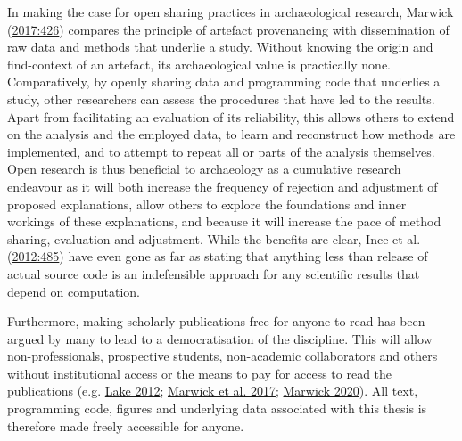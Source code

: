 \documentclass[
  12pt,
  a4paper,
  oneside]{book}
\begin{document}
In making the case for open sharing practices in archaeological research, Marwick (\protect\hyperlink{ref-marwick2017}{2017:426}) compares the principle of artefact provenancing with dissemination of raw data and methods that underlie a study. Without knowing the origin and find-context of an artefact, its archaeological value is practically none. Comparatively, by openly sharing data and programming code that underlies a study, other researchers can assess the procedures that have led to the results. Apart from facilitating an evaluation of its reliability, this allows others to extend on the analysis and the employed data, to learn and reconstruct how methods are implemented, and to attempt to repeat all or parts of the analysis themselves. Open research is thus beneficial to archaeology as a cumulative research endeavour as it will both increase the frequency of rejection and adjustment of proposed explanations, allow others to explore the foundations and inner workings of these explanations, and because it will increase the pace of method sharing, evaluation and adjustment. While the benefits are clear, Ince et al. (\protect\hyperlink{ref-ince2012}{2012:485}) have even gone as far as stating that \textquotesingle anything less than release of actual source code is an indefensible approach for any scientific results that depend on computation\textquotesingle.

Furthermore, making scholarly publications free for anyone to read has been argued by many to lead to a democratisation of the discipline. This will allow non-professionals, prospective students, non-academic collaborators and others without institutional access or the means to pay for access to read the publications (e.g. \protect\hyperlink{ref-lake2012}{Lake 2012}; \protect\hyperlink{ref-marwick2017a}{Marwick et al. 2017}; \protect\hyperlink{ref-marwick2020}{Marwick 2020}). All text, programming code, figures and underlying data associated with this thesis is therefore made freely accessible for anyone.
\end{document}
